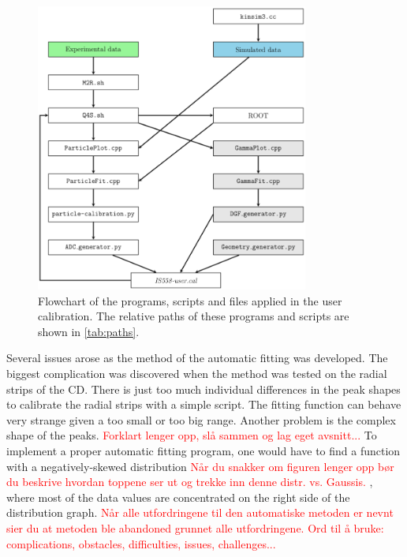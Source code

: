 \documentclass[twoside,english]{uiofysmaster/uiofysmaster}
\let\orgautoref\autoref
\renewcommand{\autoref}
        {%
		 \def\sectionautorefname{Section}%
		 \def\subsectionautorefname{Section}%
		 \def\subsubsectionautorefname{Section}%
		 \def\chapterautorefname{Chapter}%
          \orgautoref}
\begin{document}
\begin{figure}[ht]
	\centering
	\includegraphics[width=0.8\textwidth]{Images/Flowchart.png}
	\caption{Flowchart of the programs, scripts and files applied in the user calibration. The relative paths of these programs and scripts are shown in \autoref{tab:paths}.}
	\label{fig:cal_FC}
\end{figure}


Several issues arose as the method of the automatic fitting was developed. 
The biggest complication was discovered when the method was tested on the radial strips of the CD.
There is just too much individual differences in the peak shapes to calibrate the radial strips with a simple script.
The fitting function can behave very strange given a too small or too big range.
Another problem is the complex shape of the peaks. \textcolor{red}{Forklart lenger opp, slå sammen og lag eget avsnitt...}
To implement a proper automatic fitting program, one would have to find a function with a negatively-skewed distribution \textcolor{red}{Når du snakker om figuren lenger opp bør du beskrive hvordan toppene ser ut og trekke inn denne distr. vs. Gaussis. }, where most of the data values are concentrated on the right side of the distribution graph. 
\textcolor{red}{Når alle utfordringene til den automatiske metoden er nevnt sier du at metoden ble abandoned grunnet alle utfordringene. 
Ord til å bruke: complications, obstacles, difficulties, issues, challenges...}
\end{document}
